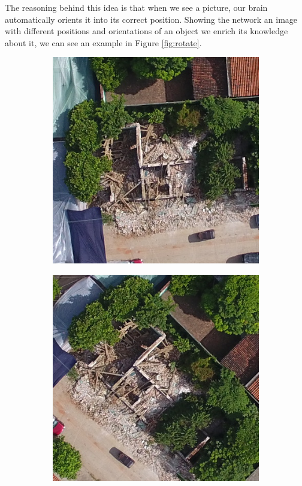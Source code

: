 The reasoning behind this idea is that when we see a picture, our brain automatically orients it into its correct position. Showing the network an image with different positions and orientations of an object we enrich its knowledge about it, we can see an example in Figure \ref{fig:rotate}.\\

\begin{figure}[!h]
  \centering
    \begin{subfigure}{.24\textwidth}
        \includegraphics[width=\textwidth]{images/rotation4.jpg}
    \end{subfigure}
    \begin{subfigure}{.24\textwidth}
        \includegraphics[width=\textwidth]{images/rotation3.jpg}

\end{subfigure}
\end{figure}
